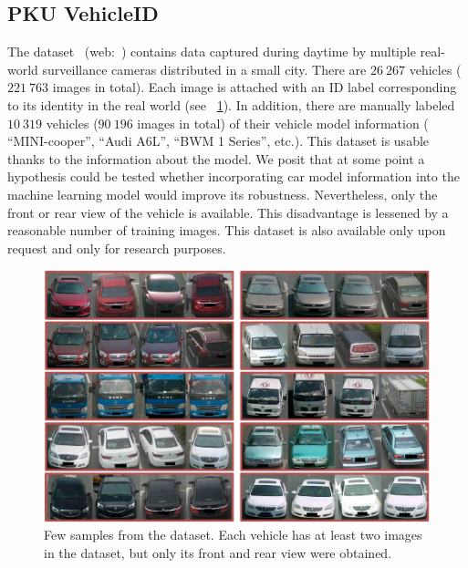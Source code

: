 \subsection{PKU VehicleID}
\label{ssec:DatasetPKUVehicleID}

The  dataset~\cite{liu2016deepreldist} (web:~\cite{webpkuvehicledataset}) contains data captured during daytime by multiple real-world surveillance cameras distributed in a small city. There are $26\ 267$ vehicles ($221\ 763$ images in total). Each image is attached with an ID label corresponding to its identity in the real world (see \figtext{}~\ref{fig:VehicleIDDataset}). In addition, there are manually labeled $10\ 319$ vehicles ($90\ 196$ images in total) of their vehicle model information (\ietext{} “MINI-cooper”, “Audi A6L”, “BWM 1 Series”, etc.). This dataset is usable thanks to the information about the model. We posit that at some point a hypothesis could be tested whether incorporating car model information into the machine learning model would improve its robustness. Nevertheless, only the front or rear view of the vehicle is available. This disadvantage is lessened by a reasonable number of training images. This dataset is also available only upon request and only for research purposes.

\begin{figure}[t]
    \centerline{\includegraphics[width=0.5\linewidth]{figures/datasets/vehicleid_overview.pdf}}
    \caption[ dataset]{Few samples from the  dataset. Each vehicle has at least two images in the dataset, but only its front and rear view were obtained. }
    \label{fig:VehicleIDDataset}
\end{figure}

